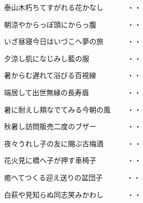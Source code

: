 \begin{shiika}泰山木朽ちてすがれる花かなし　　　
\hfill{・・}\end{shiika}

\begin{shiika}朝涼やからっぽ頭にからっ腹　　　　
\hfill{・・}\end{shiika}

\begin{shiika}いざ昼寝今日はいづこへ夢の旅　　　
\hfill{・・}\end{shiika}

\begin{shiika}夕涼し肌になじみし藍の服　　　　　
\hfill{・・}\end{shiika}

\begin{shiika}暑からむ遅れて浴びる百視線　　　　
\hfill{・・}\end{shiika}

\begin{shiika}端居して出世無縁の長寿眉　　　　　
\hfill{・・}\end{shiika}

\begin{shiika}暑に耐えし頬なでてみる今朝の風　　
\hfill{・・}\end{shiika}

\begin{shiika}秋暑し訪問販売二度のブザー　　　　
\hfill{・・}\end{shiika}

\begin{shiika}夜々うれし子の友に賜ぶ古梅酒　　　
\hfill{・・}\end{shiika}

\begin{shiika}花火見に橋へ子が押す車椅子　　　　
\hfill{・・}\end{shiika}

\begin{shiika}癒へてつくる迎え送りの盆団子　　　
\hfill{・・}\end{shiika}

\begin{shiika}白萩や見知らぬ同志笑みかわし　　　
\hfill{・・}\end{shiika}

